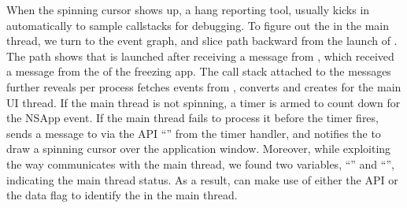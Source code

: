 When the spinning cursor shows up, a hang reporting tool, \spindump usually
kicks in automatically to sample callstacks for debugging. To figure out the
\spinningnode in the main thread, we turn to the event graph, and slice path
backward from the launch of \spindump.
The path shows that \spindump is launched after receiving a message from
, which received a message from the  of
the freezing app. The call stack attached to the messages further reveals
 per process fetches  events from
, converts and creates  for the main UI
thread. If the main thread is not spinning, a timer is armed to count down
for the NSApp event. If the main thread fails to process it before the timer
fires,  sends a message to  via the API
``'' from the timer handler, and 
notifies the  to draw a spinning cursor over the application
window. Moreover, while exploiting the way  communicates with
the main thread, we found two variables, ``'' and
``'', indicating the main thread status. As a
result, \xxx can make use of either the API or the data flag to identify the
\spinningnode in the main thread.




